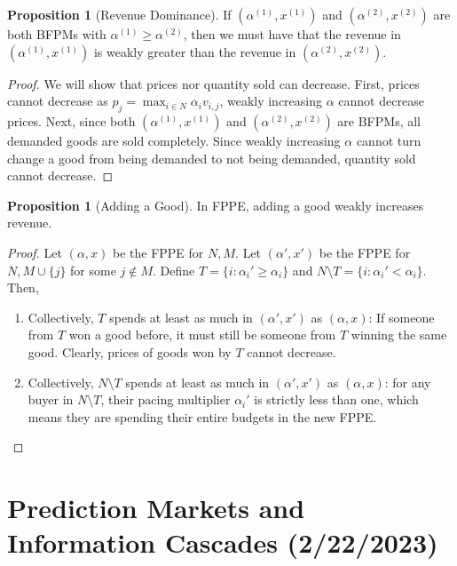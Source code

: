 \documentclass[dvipsnames]{article}
\theoremstyle{definition}
\newtheorem{proposition}[definition]{Proposition}
\theoremstyle{remark}
\begin{document}
\begin{proposition}[Revenue Dominance]
	If $(\alpha^{(1)},x^{(1)})$ and $(\alpha^{(2)},x^{(2)})$ are both BFPMs with $\alpha^{(1)} \geq \alpha^{(2)}$, then we must have that the revenue in $(\alpha^{(1)},x^{(1)})$ is weakly greater than the revenue in $(\alpha^{(2)},x^{(2)})$.
\end{proposition}

\begin{proof}
	We will show that prices nor quantity sold can decrease. First, prices cannot decrease as $p_j = \max_{i \in N} \alpha_i v_{i,j}$, weakly increasing $\alpha$ cannot decrease prices. Next, since both $(\alpha^{(1)},x^{(1)})$ and $(\alpha^{(2)},x^{(2)})$ are  BFPMs, all demanded goods are sold completely. Since weakly increasing $\alpha$ cannot turn change a good from being demanded to not being demanded, quantity sold cannot decrease.
\end{proof}

\begin{proposition}[Adding a Good]
	In FPPE, adding a good weakly increases revenue.
\end{proposition}

\begin{proof}
	Let $(\alpha,x)$ be the FPPE for $N,M$. Let $(\alpha',x')$ be the FPPE for $N, M \cup \{j\}$ for some $j \notin M$. Define $T = \{i: \alpha_i' \geq \alpha_i\}$ and $N \setminus T = \{i: \alpha_i' < \alpha_i\}$. Then,
	\begin{enumerate}
		\item Collectively, $T$ spends at least as much in $(\alpha',x')$ as $(\alpha,x)$: If someone from $T$ won a good before, it must still be someone from $T$ winning the same good. Clearly, prices of goods won by $T$ cannot decrease. 
		\item Collectively, $N \setminus T$ spends at least as much in $(\alpha',x')$ as $(\alpha,x)$: for any buyer in $N \setminus T$, their pacing multiplier $\alpha_i'$ is strictly less than one, which means they are spending their entire budgets in the new FPPE.
	\end{enumerate}
\end{proof}

\newpage

\section{Prediction Markets and Information Cascades (2/22/2023)}
\end{document}
